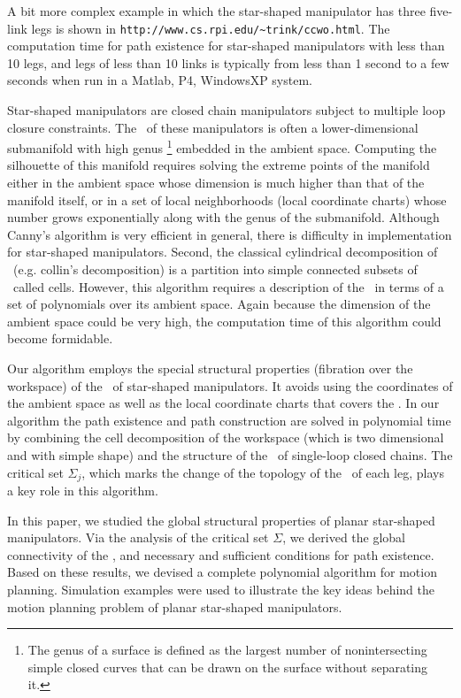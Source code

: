 A bit more complex example in which the star-shaped manipulator
has three five-link legs is shown in
\verb$http://www.cs.rpi.edu/~trink/ccwo.html$. The computation
time for path existence for star-shaped manipulators with less
than 10 legs, and legs of less than 10 links is typically from
less than 1 second to a few seconds when run in a Matlab, P4,
WindowsXP system.



 Star-shaped manipulators are closed chain
manipulators subject to multiple loop closure constraints. The
\cspace \ of these manipulators is often a lower-dimensional
submanifold with high genus \footnote{The genus of a surface is
defined as the largest number of nonintersecting simple closed
curves that can be drawn on the surface without separating it.}
embedded in the ambient space. Computing the silhouette of this
manifold requires solving the extreme points of the manifold
either in the ambient space whose dimension is much higher than
that of the manifold itself, or in a set of local neighborhoods
(local coordinate charts) whose number grows exponentially along
with the genus of the submanifold. Although Canny's algorithm is
very efficient in general, there is difficulty in implementation
for star-shaped manipulators. Second, the classical cylindrical
decomposition of \cspace \ (e.g. collin's decomposition) is a
partition into simple connected subsets of \cspace \ called cells.
However, this algorithm requires a description of the \cspace \ in
terms of a set of polynomials over its ambient space. Again
because the dimension of the ambient space could be very high, the
computation time of this algorithm could become formidable.

Our algorithm employs the special structural properties (fibration
over the workspace) of the \cspace \ of star-shaped manipulators.
It avoids using the coordinates of the ambient space as well as
the local coordinate charts that covers the \cspace. In our
algorithm the path existence and path construction are solved in
polynomial time by combining the cell decomposition of the
workspace (which is two dimensional and with simple shape) and the
structure of the \cspace \ of single-loop closed chains. The
critical set $\Sigma_j$, which marks the change of the topology of
the \cspace \ of each leg, plays a key role in this algorithm.

 \label{section-6} In this paper, we studied the
global structural properties of planar star-shaped manipulators.
Via the analysis of the critical set $\Sigma$, we derived the
global connectivity of the \cspace, and necessary and sufficient
conditions for path existence. Based on these results, we devised
a complete polynomial algorithm for motion planning. Simulation
examples were used to illustrate the key ideas behind the motion
planning problem of planar star-shaped manipulators.
